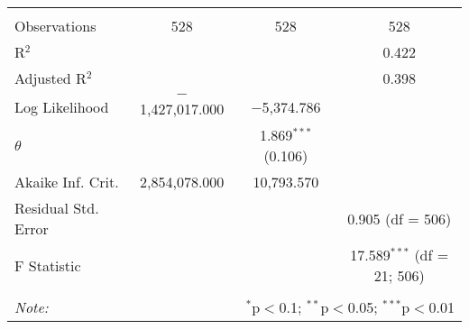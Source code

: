 \begin{table}[!htbp]
\begin{tabular}{@{\extracolsep{5pt}}lccc}
 \hline \\[-1.8ex] 
Observations & 528 & 528 & 528 \\ 
R$^{2}$ &  &  & 0.422 \\ 
Adjusted R$^{2}$ &  &  & 0.398 \\ 
Log Likelihood & $-$1,427,017.000 & $-$5,374.786 &  \\ 
$\theta$ &  & 1.869$^{***}$  (0.106) &  \\ 
Akaike Inf. Crit. & 2,854,078.000 & 10,793.570 &  \\ 
Residual Std. Error &  &  & 0.905 (df = 506) \\ 
F Statistic &  &  & 17.589$^{***}$ (df = 21; 506) \\ 
\hline 
\hline \\[-1.8ex] 
\textit{Note:}  & \multicolumn{3}{r}{$^{*}$p$<$0.1; $^{**}$p$<$0.05; $^{***}$p$<$0.01} \\ 
\end{tabular} 
\end{table} 
